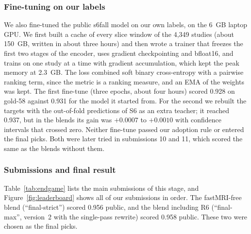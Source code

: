 \subsubsection{Fine-tuning on our labels} We also fine-tuned the public s6fall model on our own labels, on the 6~GB laptop GPU. We first built a cache of every slice window of the 4,349 studies (about 150~GB, written in about three hours) and then wrote a trainer that freezes the first two stages of the encoder, uses gradient checkpointing and bfloat16, and trains on one study at a time with gradient accumulation, which kept the peak memory at 2.3~GB. The loss combined soft binary cross-entropy with a pairwise ranking term, since the metric is a ranking measure, and an EMA of the weights was kept. The first fine-tune (three epochs, about four hours) scored 0.928 on gold-58 against 0.931 for the model it started from. For the second we rebuilt the targets with the out-of-fold predictions of S6 as an extra teacher; it reached 0.937, but in the blends its gain was $+0.0007$ to $+0.0010$ with confidence intervals that crossed zero. Neither fine-tune passed our adoption rule or entered the final picks. Both were later tried in submissions 10 and 11, which scored the same as the blends without them.

\subsubsection{Submissions and final result} Table~\ref{tab:endgame} lists the main submissions of this stage, and Figure~\ref{fig:leaderboard} shows all of our submissions in order. The fastMRI-free blend (``final-strict'') scored 0.956 public, and the blend including R6 (``final-max'', version~2 with the single-pass rewrite) scored 0.958 public. These two were chosen as the final picks.

